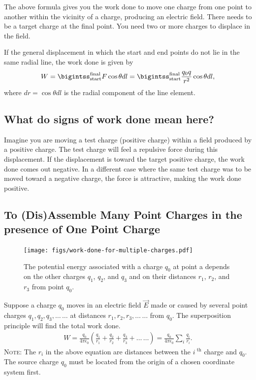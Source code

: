 \documentclass[12pt,b4paper]{article}
\begin{document}
The above formula gives you the work done to move one charge from one point to another within the vicinity of a charge, producing an electric field. There needs to be a target charge at the final point. You need two or more charges to displace in the field. 

If the general displacement in which the start and end points do not lie in the same radial line, the work done is given by
\begin{align}
    W=\bigintss_{\text{start}}^{\text{final}}F\cos\theta dl=\bigintss_{\text{start}}^{\text{final}}\frac{q_0q}{r^2}\cos\theta dl,
\end{align}
where $dr=\cos\theta dl$ is the radial component of the line element.
\subsection*{What do signs of work done mean here?}
Imagine you are moving a test charge (positive charge) within a field produced by a positive charge. The test charge will feel a repulsive force during this displacement. If the displacement is toward the target positive charge, the work done comes out negative. In a different case where the same test charge was to be moved toward a negative charge, the force is attractive, making the work done positive.
\subsection{To (Dis)Assemble Many Point Charges in the presence of One Point Charge}
\begin{figure}[H]
    \centering
    \texttt{[image: figs/work-done-for-multiple-charges.pdf]}
    \caption{The potential energy associated with a charge $q_0$ at point a depends on the other charges $q_1$, $q_2$, and $q_3$ and on their distances $r_1$, $r_2$, and $r_3$ from point $q_0$.}
    \label{fig:work-done-several-point}
\end{figure}
Suppose a charge $q_0$ moves in an electric field $\vec{E}$ made or caused by several point charges $q_1,q_2,q_3,\ldots\,\ldots$ at distances $r_1,r_2,r_3,\ldots\,\ldots$ from $q_0$. The superposition principle will find the total work done.
\begin{align}
    W=\frac{q_0}{4\pi\epsilon_0}\left(\frac{q_1}{r_1}+\frac{q_2}{r_2}+\frac{q_3}{r_3}+\ldots\,\ldots\right)=\frac{q_0}{4\pi\epsilon_0}\sum_i\frac{q_i}{r_i}.
\end{align}
\textsc{Note}: The $r_{i}$ in the above equation are distances between the $i^{\text{ th}}$ charge and $q_0$. The source charge $q_0$ must be located from the origin of a chosen coordinate system first.
\end{document}

